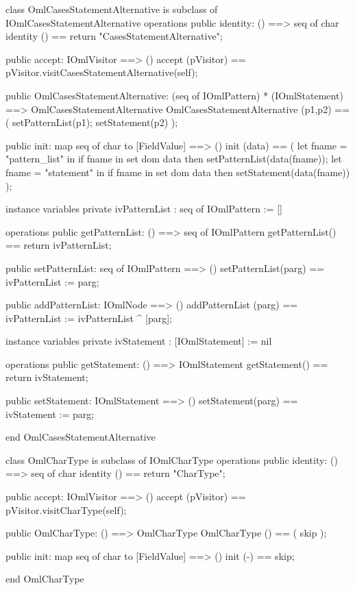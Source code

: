 \begin{vdm_al}
class OmlCasesStatementAlternative is subclass of IOmlCasesStatementAlternative
operations
  public identity: () ==> seq of char
  identity () == return "CasesStatementAlternative";

  public accept: IOmlVisitor ==> ()
  accept (pVisitor) == pVisitor.visitCasesStatementAlternative(self);

  public OmlCasesStatementAlternative:
      (seq of IOmlPattern) *
      (IOmlStatement) ==> OmlCasesStatementAlternative
  OmlCasesStatementAlternative (p1,p2) == 
   ( setPatternList(p1);
     setStatement(p2) );

  public init: map seq of char to [FieldValue] ==> ()
  init (data) ==
    ( let fname = "pattern_list" in
        if fname in set dom data
        then setPatternList(data(fname));
      let fname = "statement" in
        if fname in set dom data
        then setStatement(data(fname)) );

instance variables
  private ivPatternList : seq of IOmlPattern := []

operations
  public getPatternList: () ==> seq of IOmlPattern
  getPatternList() == return ivPatternList;

  public setPatternList: seq of IOmlPattern ==> ()
  setPatternList(parg) == ivPatternList := parg;

  public addPatternList: IOmlNode ==> ()
  addPatternList (parg) == ivPatternList := ivPatternList ^ [parg];

instance variables
  private ivStatement : [IOmlStatement] := nil

operations
  public getStatement: () ==> IOmlStatement
  getStatement() == return ivStatement;

  public setStatement: IOmlStatement ==> ()
  setStatement(parg) == ivStatement := parg;

end OmlCasesStatementAlternative
\end{vdm_al}

\begin{vdm_al}
class OmlCharType is subclass of IOmlCharType
operations
  public identity: () ==> seq of char
  identity () == return "CharType";

  public accept: IOmlVisitor ==> ()
  accept (pVisitor) == pVisitor.visitCharType(self);

  public OmlCharType:
      () ==> OmlCharType
  OmlCharType () == 
    ( skip );

  public init: map seq of char to [FieldValue] ==> ()
  init (-) == skip;

end OmlCharType
\end{vdm_al}


